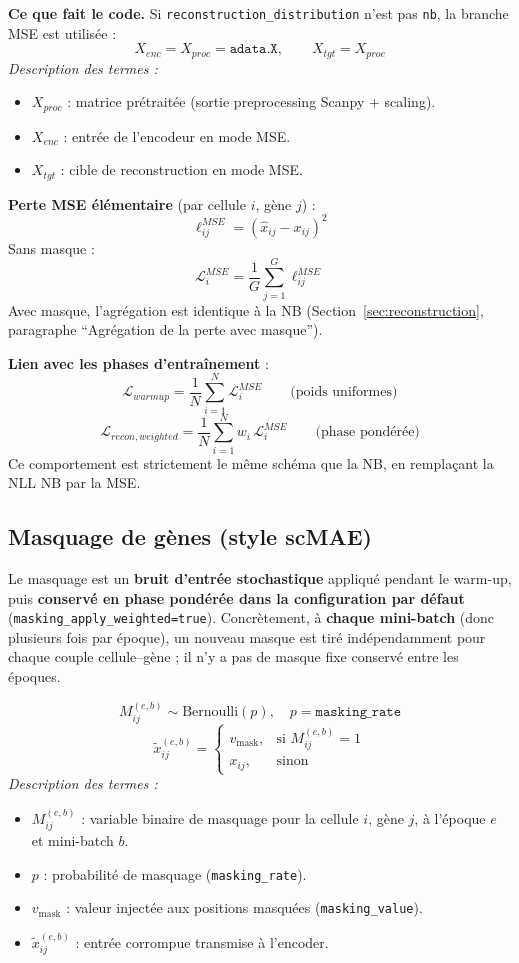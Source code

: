\documentclass[11pt,a4paper]{article}
\begin{document}
\textbf{Ce que fait le code.} Si \texttt{reconstruction\_distribution} n'est pas \texttt{nb}, la branche MSE est utilis\'ee :
\[
  X_{enc}=X_{proc}=\texttt{adata.X}, \qquad X_{tgt}=X_{proc}
\]
\textit{Description des termes :}
\begin{itemize}[nosep]
  \item $X_{proc}$ : matrice pr\'etrait\'ee (sortie preprocessing Scanpy + scaling).
  \item $X_{enc}$ : entr\'ee de l'encodeur en mode MSE.
  \item $X_{tgt}$ : cible de reconstruction en mode MSE.
\end{itemize}

\textbf{Perte MSE \'el\'ementaire} (par cellule $i$, g\`ene $j$) :
\[
  \ell^{MSE}_{ij} = \left(\hat{x}_{ij} - x_{ij}\right)^2
\]
Sans masque :
\[
  \mathcal{L}^{MSE}_i = \frac{1}{G}\sum_{j=1}^{G}\ell^{MSE}_{ij}
\]
Avec masque, l'agr\'egation est identique \`a la NB (Section~\ref{sec:reconstruction}, paragraphe ``Agr\'egation de la perte avec masque'').

\textbf{Lien avec les phases d'entra\^inement} :
\[
  \mathcal{L}_{warmup}=\frac{1}{N}\sum_{i=1}^{N}\mathcal{L}^{MSE}_i
  \qquad\text{(poids uniformes)}
\]
\[
  \mathcal{L}_{recon,weighted}=\frac{1}{N}\sum_{i=1}^{N}w_i\,\mathcal{L}^{MSE}_i
  \qquad\text{(phase pond\'er\'ee)}
\]
Ce comportement est strictement le m\^eme sch\'ema que la NB, en rempla\c{c}ant la NLL NB par la MSE.

\subsection{Masquage de g\`enes (style scMAE)}

Le masquage est un \textbf{bruit d'entr\'ee stochastique} appliqu\'e pendant le warm-up, puis \textbf{conserv\'e en phase pond\'er\'ee dans la configuration par d\'efaut} (\texttt{masking\_apply\_weighted=true}). Concr\`etement, \`a \textbf{chaque mini-batch} (donc plusieurs fois par \'epoque), un nouveau masque est tir\'e ind\'ependamment pour chaque couple cellule--g\`ene ; il n'y a pas de masque fixe conserv\'e entre les \'epoques.

\[
M_{ij}^{(e,b)} \sim \mathrm{Bernoulli}(p), \quad p=\texttt{masking\_rate}
\]
\[
\tilde{x}_{ij}^{(e,b)} =
\begin{cases}
v_{\text{mask}}, & \text{si } M_{ij}^{(e,b)}=1 \\
x_{ij}, & \text{sinon}
\end{cases}
\]
\textit{Description des termes :}
\begin{itemize}[nosep]
  \item $M_{ij}^{(e,b)}$ : variable binaire de masquage pour la cellule $i$, g\`ene $j$, \`a l'\'epoque $e$ et mini-batch $b$.
  \item $p$ : probabilit\'e de masquage (\texttt{masking\_rate}).
  \item $v_{\text{mask}}$ : valeur inject\'ee aux positions masqu\'ees (\texttt{masking\_value}).
  \item $\tilde{x}_{ij}^{(e,b)}$ : entr\'ee corrompue transmise \`a l'encoder.
\end{itemize}
\end{document}
